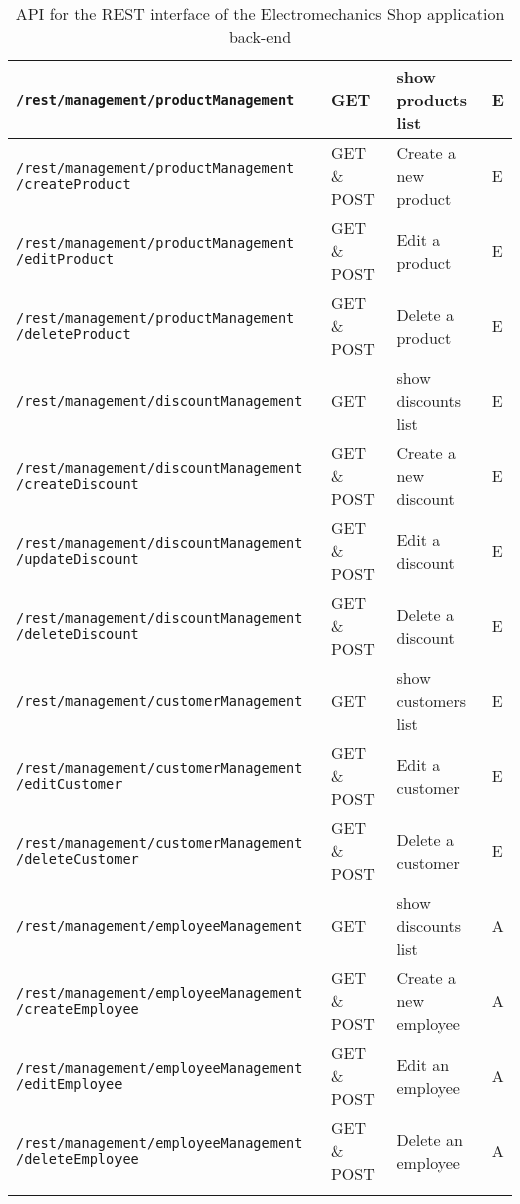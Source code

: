 \begin{longtable}{|p{}|p{} |p{}|p{}|}

\texttt{/rest/management/productManagement} & GET & show products list & E\\\hline
\texttt{/rest/management/productManagement} \texttt{/createProduct} & GET \& POST & Create a new product & E\\\hline
\texttt{/rest/management/productManagement} \texttt{/editProduct} & GET \& POST & Edit a product & E\\\hline
\texttt{/rest/management/productManagement} \texttt{/deleteProduct} & GET \& POST & Delete a product & E\\\hline

\texttt{/rest/management/discountManagement} & GET & show discounts list & E\\\hline
\texttt{/rest/management/discountManagement} \texttt{/createDiscount} & GET \& POST & Create a new discount & E\\\hline
\texttt{/rest/management/discountManagement} \texttt{/updateDiscount}& GET \& POST & Edit a discount & E\\\hline
\texttt{/rest/management/discountManagement} \texttt{/deleteDiscount} & GET \& POST & Delete a discount & E\\\hline

\texttt{/rest/management/customerManagement} & GET & show customers list & E\\\hline
\texttt{/rest/management/customerManagement} \texttt{/editCustomer}& GET \& POST & Edit a customer & E\\\hline
\texttt{/rest/management/customerManagement} \texttt{/deleteCustomer}& GET \& POST & Delete a customer & E\\\hline

\texttt{/rest/management/employeeManagement} & GET & show discounts list & A\\\hline
\texttt{/rest/management/employeeManagement} \texttt{/createEmployee}& GET \& POST & Create a new employee & A\\\hline
\texttt{/rest/management/employeeManagement} \texttt{/editEmployee} & GET \& POST & Edit an employee & A\\\hline
\texttt{/rest/management/employeeManagement} \texttt{/deleteEmployee} & GET \& POST & Delete an employee & A\\\hline



\caption{API for the REST interface of the Electromechanics
Shop application back-end}
\label{tab:ApiRest}
\end{longtable}